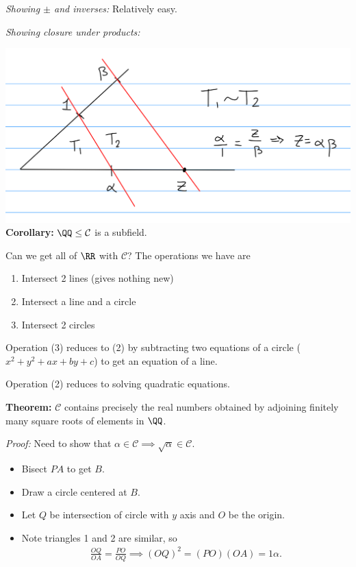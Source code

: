 \emph{Showing \(\pm\) and inverses:} Relatively easy.

\emph{Showing closure under products:}

\includegraphics{figures/2019-09-17-09:48.png}\\

\textbf{Corollary:} \(\QQ \leq \mathcal C\) is a subfield.

Can we get all of \(\RR\) with \(\mathcal C\)? The operations we have
are

\begin{enumerate}
\def\labelenumi{\arabic{enumi}.}
\item
  Intersect 2 lines (gives nothing new)
\item
  Intersect a line and a circle
\item
  Intersect 2 circles
\end{enumerate}

Operation (3) reduces to (2) by subtracting two equations of a circle
(\(x^2 + y^2 + ax + by + c\)) to get an equation of a line.

Operation (2) reduces to solving quadratic equations.

\textbf{Theorem:} \(\mathcal C\) contains precisely the real numbers
obtained by adjoining finitely many square roots of elements in \(\QQ\).

\emph{Proof:} Need to show that
\(\alpha \in \mathcal C \implies \sqrt \alpha \in \mathcal C\).

\begin{itemize}
\item
  Bisect \(PA\) to get \(B\).
\item
  Draw a circle centered at \(B\).
\item
  Let \(Q\) be intersection of circle with \(y\) axis and \(O\) be the
  origin.
\item
  Note triangles 1 and 2 are similar, so
  \begin{align*}
  \frac{OQ}{OA} = \frac{PO}{OQ} \implies (OQ)^2 = (PO)(OA) = 1\alpha
  .\end{align*}
\end{itemize}

